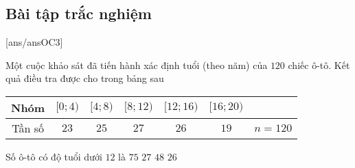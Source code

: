 \subsection{Bài tập trắc nghiệm}
[ans/ansOC3]
\begin{ex}%
	Một cuộc khảo sát đã tiến hành xác định tuổi (theo năm) của $120$ chiếc ô-tô. Kết quả điều tra được cho trong bảng sau
	\begin{center}
		\begin{tabular}{ |c|c|c|c|c|c|c| }
			\hline
			Nhóm   & $[0;4)$ & $[4;8)$ & $[8;12)$ & $[12;16)$ & $[16;20)$ &         \\
			\hline
			Tần số & $23$    & $25$    & $27$     & $26$      & $19$      & $n=120$ \\
			\hline
		\end{tabular}
	\end{center}
	Số ô-tô có độ tuổi dưới $12$ là
	\choice
	{\True $75$}
	{$27$}
	{$48$}
	{$26$}
\end{ex}
